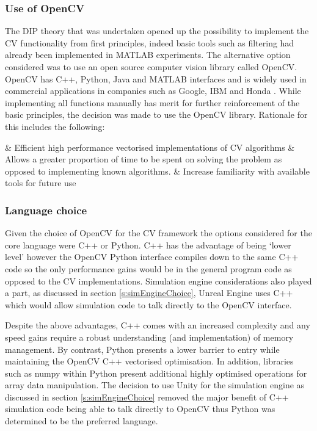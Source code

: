 \documentclass[]{aiaa-tc}%
\begin{document}
\subsubsection{Use of OpenCV}\label{s:openCV}

The DIP theory that was undertaken opened up the possibility to implement the CV functionality from first principles, indeed basic tools such as filtering had already been implemented in MATLAB experiments. The alternative option considered was to use an open source computer vision library called OpenCV. OpenCV has C++, Python, Java and MATLAB interfaces and is widely used in commercial applications in companies such as Google, IBM and Honda \citep{opencvWebsite}. While implementing all functions manually has merit for further reinforcement of the basic principles, the decision was made to use the OpenCV library. Rationale for this includes the following: 

\begin{easylist}[itemize]
	& Efficient high performance vectorised implementations of CV algorithms
	& Allows a greater proportion of time to be spent on solving the problem as opposed to implementing known algorithms.
	& Increase familiarity with available tools for future use
\end{easylist}

\subsubsection{Language choice} \label{s:pythonVc}

Given the choice of OpenCV for the CV framework the options considered for the core language were C++ or Python. C++ has the advantage of being `lower level' however the OpenCV Python interface compiles down to the same C++ code so the only performance gains would be in the general program code as opposed to the CV implementations. Simulation engine considerations also played a part, as discussed in section \ref{s:simEngineChoice}, Unreal Engine uses C++ which would allow simulation code to talk directly to the OpenCV interface.

Despite the above advantages, C++ comes with an increased complexity and any speed gains require a robust understanding (and implementation) of memory management. By contrast, Python presents a lower barrier to entry while maintaining the OpenCV C++ vectorised optimisation. In addition, libraries such as numpy within Python present additional highly optimised operations for array data manipulation. The decision to use Unity for the simulation engine as discussed in section \ref{s:simEngineChoice} removed the major benefit of C++ simulation code being able to talk directly to OpenCV thus Python was determined to be the preferred language.
\end{document}
